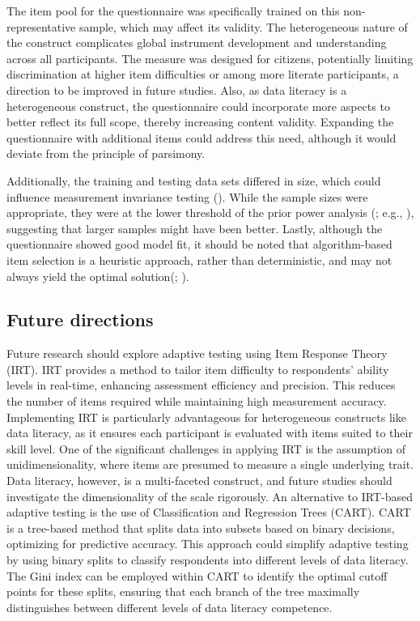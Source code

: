 \documentclass[
  12pt,
  a4paper,
  twoside]{article}
\begin{document}
The item pool for the questionnaire was specifically trained on this non-representative sample, which may affect its validity. The heterogeneous nature of the construct complicates global instrument development and understanding across all participants. The measure was designed for citizens, potentially limiting discrimination at higher item difficulties or among more literate participants, a direction to be improved in future studies. Also, as data literacy is a heterogeneous construct, the questionnaire could incorporate more aspects to better reflect its full scope, thereby increasing content validity. Expanding the questionnaire with additional items could address this need, although it would deviate from the principle of parsimony.

Additionally, the training and testing data sets differed in size, which could influence measurement invariance testing (). While the sample sizes were appropriate, they were at the lower threshold of the prior power analysis (; e.g., ), suggesting that larger samples might have been better. Lastly, although the questionnaire showed good model fit, it should be noted that algorithm-based item selection is a heuristic approach, rather than deterministic, and may not always yield the optimal solution(; ).

\subsection{Future directions}\label{future-directions}

Future research should explore adaptive testing using Item Response Theory (IRT). IRT provides a method to tailor item difficulty to respondents' ability levels in real-time, enhancing assessment efficiency and precision. This reduces the number of items required while maintaining high measurement accuracy. Implementing IRT is particularly advantageous for heterogeneous constructs like data literacy, as it ensures each participant is evaluated with items suited to their skill level. One of the significant challenges in applying IRT is the assumption of unidimensionality, where items are presumed to measure a single underlying trait. Data literacy, however, is a multi-faceted construct, and future studies should investigate the dimensionality of the scale rigorously.
An alternative to IRT-based adaptive testing is the use of Classification and Regression Trees (CART). CART is a tree-based method that splits data into subsets based on binary decisions, optimizing for predictive accuracy. This approach could simplify adaptive testing by using binary splits to classify respondents into different levels of data literacy. The Gini index can be employed within CART to identify the optimal cutoff points for these splits, ensuring that each branch of the tree maximally distinguishes between different levels of data literacy competence.
\end{document}
